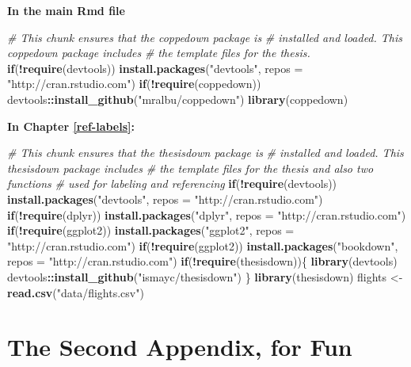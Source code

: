 \documentclass[grad,numbers]{coppe}
\newenvironment{Shaded}{\begin{snugshade}}{\end{snugshade}}
\newcommand{\CommentTok}[1]{\textcolor[rgb]{0.56,0.35,0.01}{\textit{#1}}}
\newcommand{\ControlFlowTok}[1]{\textcolor[rgb]{0.13,0.29,0.53}{\textbf{#1}}}
\newcommand{\DataTypeTok}[1]{\textcolor[rgb]{0.13,0.29,0.53}{#1}}
\newcommand{\KeywordTok}[1]{\textcolor[rgb]{0.13,0.29,0.53}{\textbf{#1}}}
\newcommand{\NormalTok}[1]{#1}
\newcommand{\OperatorTok}[1]{\textcolor[rgb]{0.81,0.36,0.00}{\textbf{#1}}}
\newcommand{\StringTok}[1]{\textcolor[rgb]{0.31,0.60,0.02}{#1}}
\begin{document}
  \textbf{In the main Rmd file}
  \begin{Shaded}
  \begin{Highlighting}[]
  \CommentTok{# This chunk ensures that the coppedown package is}
  \CommentTok{# installed and loaded. This coppedown package includes}
  \CommentTok{# the template files for the thesis.}
  \ControlFlowTok{if}\NormalTok{(}\OperatorTok{!}\KeywordTok{require}\NormalTok{(devtools))}
    \KeywordTok{install.packages}\NormalTok{(}\StringTok{"devtools"}\NormalTok{, }\DataTypeTok{repos =} \StringTok{"http://cran.rstudio.com"}\NormalTok{)}
  \ControlFlowTok{if}\NormalTok{(}\OperatorTok{!}\KeywordTok{require}\NormalTok{(coppedown))}
  \NormalTok{  devtools}\OperatorTok{::}\KeywordTok{install_github}\NormalTok{(}\StringTok{"mralbu/coppedown"}\NormalTok{)}
  \KeywordTok{library}\NormalTok{(coppedown)}
  \end{Highlighting}
  \end{Shaded}
  \textbf{In Chapter \ref{ref-labels}:}
  \begin{Shaded}
  \begin{Highlighting}[]
  \CommentTok{# This chunk ensures that the thesisdown package is}
  \CommentTok{# installed and loaded. This thesisdown package includes}
  \CommentTok{# the template files for the thesis and also two functions}
  \CommentTok{# used for labeling and referencing}
  \ControlFlowTok{if}\NormalTok{(}\OperatorTok{!}\KeywordTok{require}\NormalTok{(devtools))}
    \KeywordTok{install.packages}\NormalTok{(}\StringTok{"devtools"}\NormalTok{, }\DataTypeTok{repos =} \StringTok{"http://cran.rstudio.com"}\NormalTok{)}
  \ControlFlowTok{if}\NormalTok{(}\OperatorTok{!}\KeywordTok{require}\NormalTok{(dplyr))}
      \KeywordTok{install.packages}\NormalTok{(}\StringTok{"dplyr"}\NormalTok{, }\DataTypeTok{repos =} \StringTok{"http://cran.rstudio.com"}\NormalTok{)}
  \ControlFlowTok{if}\NormalTok{(}\OperatorTok{!}\KeywordTok{require}\NormalTok{(ggplot2))}
      \KeywordTok{install.packages}\NormalTok{(}\StringTok{"ggplot2"}\NormalTok{, }\DataTypeTok{repos =} \StringTok{"http://cran.rstudio.com"}\NormalTok{)}
  \ControlFlowTok{if}\NormalTok{(}\OperatorTok{!}\KeywordTok{require}\NormalTok{(ggplot2))}
      \KeywordTok{install.packages}\NormalTok{(}\StringTok{"bookdown"}\NormalTok{, }\DataTypeTok{repos =} \StringTok{"http://cran.rstudio.com"}\NormalTok{)}
  \ControlFlowTok{if}\NormalTok{(}\OperatorTok{!}\KeywordTok{require}\NormalTok{(thesisdown))\{}
    \KeywordTok{library}\NormalTok{(devtools)}
  \NormalTok{  devtools}\OperatorTok{::}\KeywordTok{install_github}\NormalTok{(}\StringTok{"ismayc/thesisdown"}\NormalTok{)}
  \NormalTok{  \}}
  \KeywordTok{library}\NormalTok{(thesisdown)}
  \NormalTok{flights <-}\StringTok{ }\KeywordTok{read.csv}\NormalTok{(}\StringTok{"data/flights.csv"}\NormalTok{)}
  \end{Highlighting}
  \end{Shaded}
  \hypertarget{the-second-appendix-for-fun}{%
  \chapter{The Second Appendix, for Fun}\label{the-second-appendix-for-fun}}
  
\end{document}
